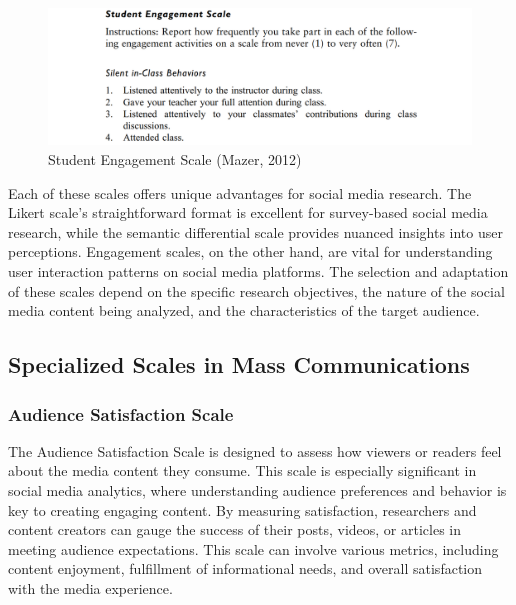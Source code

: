 \documentclass[
]{book}
\begin{document}
\begin{figure}
\centering
\includegraphics[width=1\textwidth,height=\textheight]{images/engagement.png}
\caption{Student Engagement Scale (Mazer, 2012)}
\end{figure}

Each of these scales offers unique advantages for social media research. The Likert scale's straightforward format is excellent for survey-based social media research, while the semantic differential scale provides nuanced insights into user perceptions. Engagement scales, on the other hand, are vital for understanding user interaction patterns on social media platforms. The selection and adaptation of these scales depend on the specific research objectives, the nature of the social media content being analyzed, and the characteristics of the target audience.

\hypertarget{specialized-scales-in-mass-communications}{%
\subsection*{Specialized Scales in Mass Communications}\label{specialized-scales-in-mass-communications}}

\hypertarget{audience-satisfaction-scale}{%
\subsubsection*{Audience Satisfaction Scale}\label{audience-satisfaction-scale}}

The Audience Satisfaction Scale is designed to assess how viewers or readers feel about the media content they consume. This scale is especially significant in social media analytics, where understanding audience preferences and behavior is key to creating engaging content. By measuring satisfaction, researchers and content creators can gauge the success of their posts, videos, or articles in meeting audience expectations. This scale can involve various metrics, including content enjoyment, fulfillment of informational needs, and overall satisfaction with the media experience.
\end{document}
